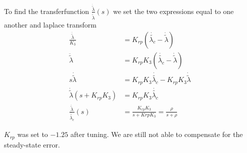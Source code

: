 To find the transferfunction $\frac{\dot{\tilde{\lambda}}}{\dot{\tilde{\lambda}}}(s)$ we set the two expressions equal to one another and laplace transform  
\begin{align*}
    \frac{\ddot{\tilde{\lambda}}}{K_3}  &=  K_{rp}(\dot{\tilde{\lambda_c}}- \dot{\tilde{\lambda}})\\
    \ddot{\tilde{\lambda}}              &= K_{rp}K_3(\dot{\tilde{\lambda_c}}- \dot{\tilde{\lambda}})\\
    s\dot{\tilde{\lambda}}              &= K_{rp}K_3\dot{\tilde{\lambda_c}} - K_{rp}K_3\dot{\tilde{\lambda}}\\
    \dot{\tilde{\lambda}}(s + K_{rp}K_3) &= K_{rp}K_3\dot{\tilde{\lambda_c}}\\
    \frac{\dot{\tilde{\lambda}}}{\dot{\tilde{\lambda_c}}}(s) &= \frac{K_{rp}K_3}{s + K{rp}K_3} = \frac{\rho}{s + \rho}
\end{align*}

$K_{rp}$ was set to $-1.25$ after tuning. We are still not able to compensate for the steady-state error. 
